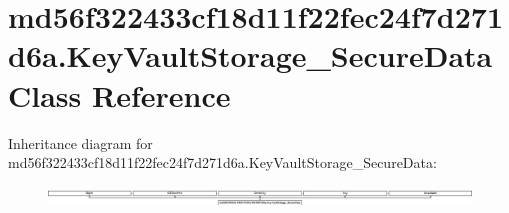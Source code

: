 \hypertarget{classmd56f322433cf18d11f22fec24f7d271d6a_1_1KeyVaultStorage__SecureData}{}\section{md56f322433cf18d11f22fec24f7d271d6a.\+Key\+Vault\+Storage\+\_\+\+Secure\+Data Class Reference}
\label{classmd56f322433cf18d11f22fec24f7d271d6a_1_1KeyVaultStorage__SecureData}
Inheritance diagram for md56f322433cf18d11f22fec24f7d271d6a.\+Key\+Vault\+Storage\+\_\+\+Secure\+Data\+:\begin{figure}[H]
\begin{center}
\leavevmode
\includegraphics[height=0.527059cm]{classmd56f322433cf18d11f22fec24f7d271d6a_1_1KeyVaultStorage__SecureData}
\end{center}
\end{figure}
